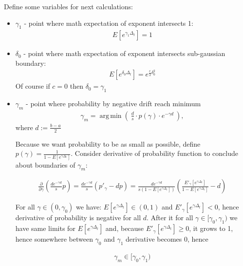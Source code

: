 \documentclass[12pt, a4paper]{article}
\DeclareMathOperator*{\argmin}{arg\,min}
\theoremstyle{remark}
\newcommand{\der}[2]{\frac{\partial #1}{\partial #2}}
\newcommand{\expp}[1]{E[e^{#1 \Delta_t}]}
\begin{document}
Define some variables for next calculations:

\begin{itemize}
    \item \(\gamma_1\) - point where math expectation of exponent intersects 1:
    \begin{align*}
        E[e^{\gamma_1 \Delta_t}] = 1
    \end{align*}
    \item \(\delta_0\) - point where math expectation of exponent intersects sub-gaussian boundary:
    \begin{align*}
        E[e^{\delta_0 \Delta_t}] = e^{\frac{c}{2}\delta_0^2}
    \end{align*}
    Of course if \(c = 0\) then \(\delta_0 = \gamma_1\)
    \item \(\gamma_m\) - point where probability by negative drift reach minimum
    \begin{align*}
        \gamma_m = \argmin \left(\ \frac{d}{s} \cdot p(\gamma) \cdot e^{-\gamma d}\ \right),
    \end{align*}
    where \(d := \frac{b - a}{2}\)

    Because we want probability to be as small as possible, define \(p(\gamma) = \frac{1}{1 - E[e^{\gamma \Delta_t}]}\). Consider derivative of probability function to conclude about boundaries of \(\gamma_m\):
    
    \begin{align*}
        \der{}{\gamma} \left(\frac{d e^{-\gamma d}}{s} p \right)= \frac{d e^{-\gamma d}}{s} \left(p'_\gamma - dp\right) = \frac{d e^{-\gamma d}}{s (1 - E[e^{\gamma \Delta_t}])} \left(\frac{E'_\gamma [e^{\gamma \Delta_t}]}{1 - E[e^{\gamma \Delta_t}]} - d\right)
    \end{align*}

    For all \(\gamma \in (0, \gamma_0)\) we have: \(\expp{\gamma} \in (0, 1)\) and \(E'_\gamma[e^{\gamma \Delta_t}] < 0\), hence derivative of probability is negative for all \(d\). After it for all \(\gamma \in [\gamma_0, \gamma_1)\) we have same limits for \(\expp{\gamma}\) and, because \(E'_\gamma[e^{\gamma \Delta_t}] \geq 0\), it grows to 1, hence somewhere between \(\gamma_0\) and \(\gamma_1\) derivative becomes 0, hence
    
    \begin{align*}
        \gamma_m \in [\gamma_0, \gamma_1)
    \end{align*}

\end{itemize}
\end{document}
